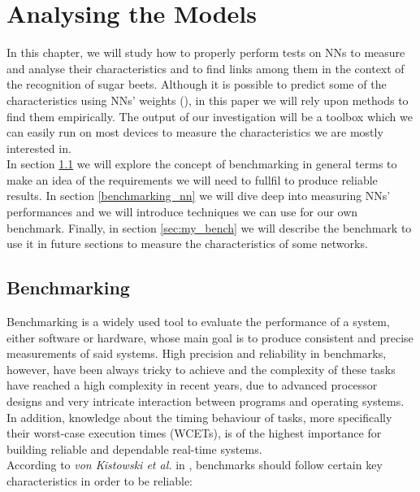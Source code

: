 \chapter{Analysing the Models}\label{ana_models}
In this chapter, we will study how to properly perform tests on NNs to measure and analyse their characteristics and to find links among them in the context of the recognition of sugar beets. Although it is possible to predict some of the characteristics using NNs' weights (\cite{Unterthiner2020PredictingNN}), in this paper we will rely upon methods to find them empirically. The output of our investigation will be a toolbox which we can easily run on most devices to measure the characteristics we are mostly interested in. \\
In section \ref{benchmarking} we will explore the concept of benchmarking in general terms to make an idea of the requirements we will need to fullfil to produce reliable results. In section \ref{benchmarking_nn} we will dive deep into measuring NNs' performances and we will introduce techniques we can use for our own benchmark. Finally, in section \ref{sec:my_bench} we will describe the benchmark to use it in future sections to measure the characteristics of some networks. 

\section{Benchmarking}\label{benchmarking}
Benchmarking is a widely used tool to evaluate the performance of a system, either software or hardware, whose main goal is to produce consistent and precise measurements of said systems. High precision and reliability in benchmarks, however, have been always tricky to achieve and the complexity of these tasks have reached a high complexity in recent years, due to advanced processor designs and very intricate interaction between programs and operating systems. \cite{DBLP:journals/corr/abs-1811-01412}\\
In addition, knowledge about the timing behaviour of tasks, more specifically their worst-case execution times (WCETs), is of the highest importance for building reliable and dependable real-time systems. \cite{Real-Time-Systems}\\
According to \textit{von Kistowski et al.} in \cite{how_to_bench}, benchmarks should follow certain key characteristics in order to be reliable:

